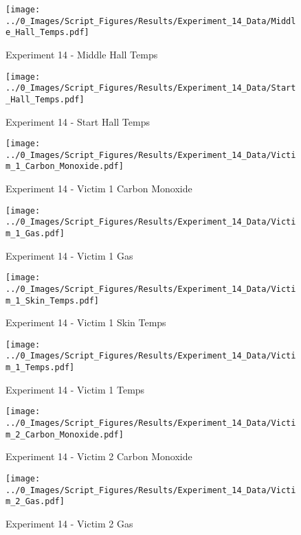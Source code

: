 	\begin{figure}[H]
		\centering
		\texttt{[image: ../0\_Images/Script\_Figures/Results/Experiment\_14\_Data/Middle\_Hall\_Temps.pdf]}
		\caption[]{Experiment 14 - Middle Hall Temps}
	\end{figure}
 
	\clearpage

	\begin{figure}[H]
		\centering
		\texttt{[image: ../0\_Images/Script\_Figures/Results/Experiment\_14\_Data/Start\_Hall\_Temps.pdf]}
		\caption[]{Experiment 14 - Start Hall Temps}
	\end{figure}
 

	\begin{figure}[H]
		\centering
		\texttt{[image: ../0\_Images/Script\_Figures/Results/Experiment\_14\_Data/Victim\_1\_Carbon\_Monoxide.pdf]}
		\caption[]{Experiment 14 - Victim 1 Carbon Monoxide}
	\end{figure}
 
	\clearpage

	\begin{figure}[H]
		\centering
		\texttt{[image: ../0\_Images/Script\_Figures/Results/Experiment\_14\_Data/Victim\_1\_Gas.pdf]}
		\caption[]{Experiment 14 - Victim 1 Gas}
	\end{figure}
 

	\begin{figure}[H]
		\centering
		\texttt{[image: ../0\_Images/Script\_Figures/Results/Experiment\_14\_Data/Victim\_1\_Skin\_Temps.pdf]}
		\caption[]{Experiment 14 - Victim 1 Skin Temps}
	\end{figure}
 
	\clearpage

	\begin{figure}[H]
		\centering
		\texttt{[image: ../0\_Images/Script\_Figures/Results/Experiment\_14\_Data/Victim\_1\_Temps.pdf]}
		\caption[]{Experiment 14 - Victim 1 Temps}
	\end{figure}
 

	\begin{figure}[H]
		\centering
		\texttt{[image: ../0\_Images/Script\_Figures/Results/Experiment\_14\_Data/Victim\_2\_Carbon\_Monoxide.pdf]}
		\caption[]{Experiment 14 - Victim 2 Carbon Monoxide}
	\end{figure}
 
	\clearpage

	\begin{figure}[H]
		\centering
		\texttt{[image: ../0\_Images/Script\_Figures/Results/Experiment\_14\_Data/Victim\_2\_Gas.pdf]}
		\caption[]{Experiment 14 - Victim 2 Gas}
	\end{figure}
 

